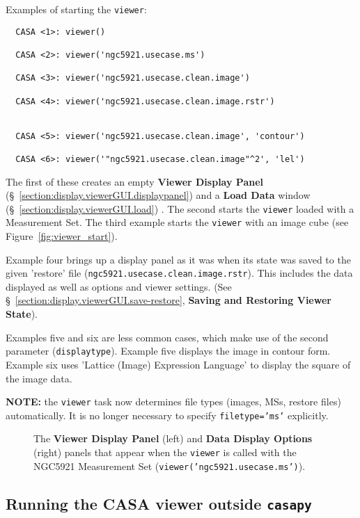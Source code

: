 Examples of starting the {\tt viewer}:
\small
\begin{verbatim}
  CASA <1>: viewer()

  CASA <2>: viewer('ngc5921.usecase.ms')

  CASA <3>: viewer('ngc5921.usecase.clean.image')
  
  CASA <4>: viewer('ngc5921.usecase.clean.image.rstr')
  
  
  CASA <5>: viewer('ngc5921.usecase.clean.image', 'contour')
  
  CASA <6>: viewer('"ngc5921.usecase.clean.image"^2', 'lel')
\end{verbatim}
\normalsize
The first of these creates
an empty {\bf Viewer Display Panel} 
(\S~\ref{section:display.viewerGUI.displaypanel}) and a {\bf Load Data} 
window (\S~\ref{section:display.viewerGUI.load}) .  The second starts the
{\tt viewer} loaded with a Measurement Set.  The third example
starts the {\tt viewer} with an image cube 
(see Figure~\ref{fig:viewer_start}).  

Example four brings up a display panel as it was when its state was saved
to the given 'restore' file ({\tt ngc5921.usecase.clean.image.rstr}).
This includes the data displayed as well as options and viewer
settings.  (See \S~\ref{section:display.viewerGUI.save-restore},
{\bf Saving and Restoring Viewer State}).

Examples five and six are less common cases, which make use of the second
parameter ({\tt displaytype}).  Example five displays the image in contour
form.  Example six uses 'Lattice (Image) Expression Language' to display the
square of the image data.

{\bf NOTE:} the {\tt viewer} task now determines file types (images, MSs,
restore files) automatically.  It is no longer necessary to specify
{\tt filetype='ms'} explicitly.

\begin{figure}[h!]
\begin{center}
\caption{\label{fig:viewer_start_ms} The {\bf Viewer Display Panel}
(left) and {\bf Data Display Options} (right) panels that appear when the 
{\tt viewer} is called with the NGC5921 Measurement Set
({\tt viewer('ngc5921.usecase.ms')}).} 
\hrulefill
\end{center}
\end{figure}

\subsection{Running the CASA viewer outside {\tt casapy}}
\label{section:display.start.casaviewer}

